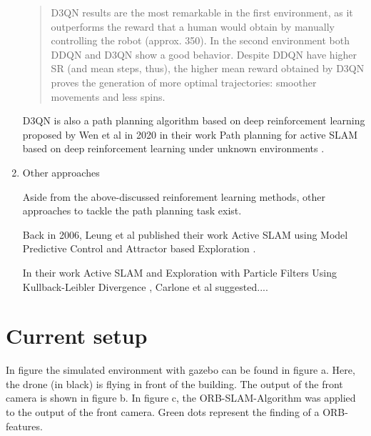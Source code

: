 \begin{enumerate}
\begin{quote}
	D3QN results are the most remarkable in the first environment, as it
outperforms the reward that a human would obtain by manually controlling the robot (approx. 350). In the
second environment both DDQN and D3QN show a good behavior. Despite DDQN have higher SR
(and mean steps, thus), the higher mean reward obtained by D3QN proves the generation of more
optimal trajectories: smoother movements and less spins. \cite{deep}
	\end{quote}
	D3QN is also a path planning algorithm based on deep reinforcement learning proposed by Wen et al in 2020 in their work Path planning for 
	active SLAM based on deep reinforcement learning under unknown environments \cite{accurat}.
	
	\item{Other approaches}
	
	Aside from the above-discussed reinforement learning methods, other approaches to tackle the path planning task exist. 
	
	Back in 2006, Leung et al published their work Active SLAM using Model Predictive Control and Attractor based Exploration \cite{ppap2}.

	In their work Active SLAM and Exploration with Particle Filters Using Kullback-Leibler Divergence \cite{ppap1}, Carlone et al suggested....
	
	\end{enumerate}
	

	
	
	\section{Current setup}
	
	In figure \cite{fig:simfigs} the simulated environment with gazebo can be found in figure a. Here, the drone (in black) is flying in front of the building. 
	The output of the front camera is shown in figure b. In figure c, the ORB-SLAM-Algorithm was applied to the output of the front camera. Green dots represent the 
	finding of a ORB-features.
	
